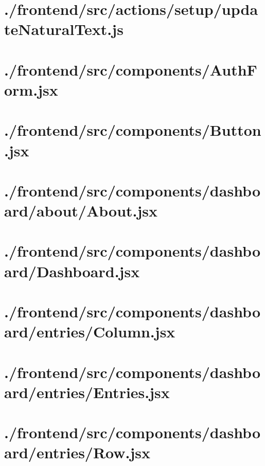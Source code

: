 \documentclass[11pt]{informatics-report}
\begin{document}
\newpage
\section{./frontend/src/actions/setup/updateNaturalText.js}


\newpage
\section{./frontend/src/components/AuthForm.jsx}


\newpage
\section{./frontend/src/components/Button.jsx}


\newpage
\section{./frontend/src/components/dashboard/about/About.jsx}


\newpage
\section{./frontend/src/components/dashboard/Dashboard.jsx}


\newpage
\section{./frontend/src/components/dashboard/entries/Column.jsx}


\newpage
\section{./frontend/src/components/dashboard/entries/Entries.jsx}


\newpage
\section{./frontend/src/components/dashboard/entries/Row.jsx}

\end{document}
